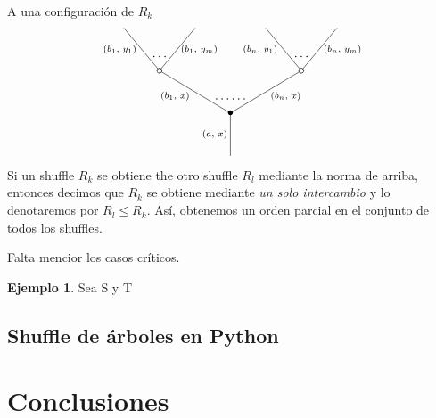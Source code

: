 \documentclass[11pt,a4paper,openright,oneside]{article}
\numberwithin{equation}{section}
\theoremstyle{definition}
\newtheorem{ex}[teo]{Ejemplo}
\begin{document}
A una configuraci\'on de $R_k$
\begin{equation}
    \xy
    <0.08cm, 0cm>:
    (0.0, 0.0)*{}="1"; %
    (0.0, 15.0)*=0{\bullet}="2"; %
    (-25.0, 30.0)*\cir<2pt>{}="3"; %
    (-37.5, 45.0)*{}="4"; %
    (-12.5, 45.0)*{}="5"; %
    (25.0, 30.0)*\cir<2pt>{}="6"; %
    (12.5, 45.0)*{}="7"; %
    (37.5, 45.0)*{}="8"; %
    "1";"2" **\dir{-};
    "2";"3" **\dir{-};
    "3";"4" **\dir{-};
    "3";"5" **\dir{-};
    "2";"6" **\dir{-};
    "6";"7" **\dir{-};
    "6";"8" **\dir{-};
    (-5.5, 7.5)*=0{\scriptstyle (a,\text{ }x)};
    (-19.5, 21)*=0{\scriptstyle (b_1,\text{ }x)};
    (-39, 37.5)*=0{\scriptstyle (b_1,\text{ }y_1)};
    (-11, 37.5)*=0{\scriptstyle (b_1,\text{ }y_m)};
    (19.5, 21)*=0{\scriptstyle (b_n,\text{ }x)};
    (10.5, 37.5)*=0{\scriptstyle (b_n,\text{ }y_1)};
    (39.5, 37.5)*=0{\scriptstyle (b_n,\text{ }y_m)};
    (-25,35)*{\dots};
    (25,35)*{\dots};
    (0,20)*{\dots\dots};
    \endxy
\end{equation}
Si un shuffle $R_k$ se obtiene the otro shuffle $R_l$ mediante la norma de arriba, entonces decimos que $R_k$ se obtiene mediante \emph{un solo intercambio} y lo denotaremos por $R_l\le R_k$.
As\'i, obtenemos un orden parcial en el conjunto de todos los shuffles.

Falta mencior los casos cr\'iticos.
\begin{ex}
    Sea S y T
\end{ex}


\subsection{Shuffle de \'arboles en Python}
\newpage


\section{Conclusiones}
\newpage

\end{document}
